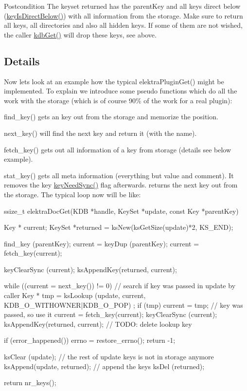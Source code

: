 \begin{DoxyPostcond}{Postcondition}
The keyset {\ttfamily returned} has the {\ttfamily parentKey} and all keys direct below (\hyperlink{group__keytest_ga4f175aafd98948ce6c774f3bd92b72ca}{keyIsDirectBelow()}) with all information from the storage. Make sure to return all keys, all directories and also all hidden keys. If some of them are not wished, the caller \hyperlink{group__kdb_ga28e385fd9cb7ccfe0b2f1ed2f62453a1}{kdbGet()} will drop these keys, see above.
\end{DoxyPostcond}
\hypertarget{group__plugin_detail}{}\subsection{Details}\label{group__plugin_detail}
Now lets look at an example how the typical elektraPluginGet() might be implemented. To explain we introduce some pseudo functions which do all the work with the storage (which is of course 90\% of the work for a real plugin):
\begin{DoxyItemize}
\item find\_\-key() gets an key out from the storage and memorize the position.
\item next\_\-key() will find the next key and return it (with the name).
\item fetch\_\-key() gets out all information of a key from storage (details see below example).
\item stat\_\-key() gets all meta information (everything but value and comment). It removes the key \hyperlink{group__keytest_gaf247df0de7aca04b32ef80e39ef12950}{keyNeedSync()} flag afterwards. returns the next key out from the storage. The typical loop now will be like: 
\begin{DoxyCode}
ssize_t elektraDocGet(KDB *handle, KeySet *update, const Key *parentKey) {
        Key * current;
        KeySet *returned = ksNew(ksGetSize(update)*2, KS_END);

        find_key (parentKey);
        current = keyDup (parentKey);
        current = fetch_key(current);

        keyClearSync (current);
        ksAppendKey(returned, current);

        while ((current = next_key()) != 0)
        {
                // search if key was passed in update by caller
                Key * tmp = ksLookup (update, current, KDB_O_WITHOWNER|KDB_O_POP)
      ;
                if (tmp) current = tmp; // key was passed, so use it
                current = fetch_key(current);
                keyClearSync (current);
                ksAppendKey(returned, current);
                // TODO: delete lookup key
        }

        if (error_happened())
        {
                errno = restore_errno();
                return -1;
        }

        ksClear (update); // the rest of update keys is not in storage anymore
        ksAppend(update, returned); // append the keys
        ksDel (returned);

        return nr_keys();
}
\end{DoxyCode}

\end{DoxyItemize}

